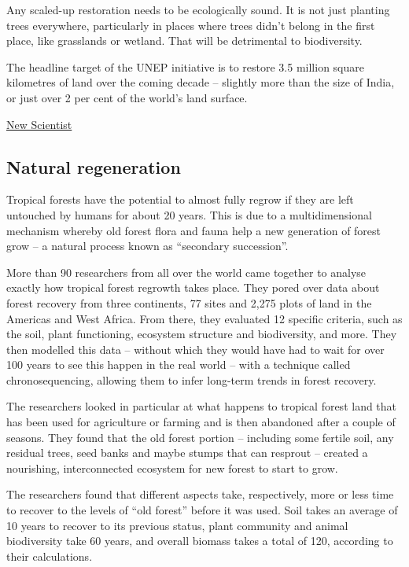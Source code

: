 \documentclass[
]{book}
\begin{document}
Any scaled-up restoration needs to be ecologically sound.
It is not just planting trees everywhere, particularly in places where trees
didn't belong in the first place, like grasslands or wetland.
That will be detrimental to biodiversity.

The headline target of the UNEP initiative is to restore 3.5 million square kilometres of land over the coming decade -- slightly more than the size of India, or just over 2 per cent of the world's land surface.

\href{https://www.newscientist.com/article/mg24933223-300-rescue-plan-for-nature-how-to-fix-the-biodiversity-crisis/}{New Scientist}

\hypertarget{natural-regeneration}{%
\subsection{Natural regeneration}\label{natural-regeneration}}

Tropical forests have the potential to almost fully regrow if they are left untouched by humans for about 20 years. This is due to a multidimensional mechanism whereby old forest flora and fauna help a new generation of forest grow -- a natural process known as ``secondary succession''.

More than 90 researchers from all over the world came together to analyse exactly how tropical forest regrowth takes place. They pored over data about forest recovery from three continents, 77 sites and 2,275 plots of land in the Americas and West Africa. From there, they evaluated 12 specific criteria, such as the soil, plant functioning, ecosystem structure and biodiversity, and more. They then modelled this data -- without which they would have had to wait for over 100 years to see this happen in the real world -- with a technique called chronosequencing, allowing them to infer long-term trends in forest recovery.

The researchers looked in particular at what happens to tropical forest land that has been used for agriculture or farming and is then abandoned after a couple of seasons. They found that the old forest portion -- including some fertile soil, any residual trees, seed banks and maybe stumps that can resprout -- created a nourishing, interconnected ecosystem for new forest to start to grow.

The researchers found that different aspects take, respectively, more or less time to recover to the levels of ``old forest'' before it was used. Soil takes an average of 10 years to recover to its previous status, plant community and animal biodiversity take 60 years, and overall biomass takes a total of 120, according to their calculations.
\end{document}
